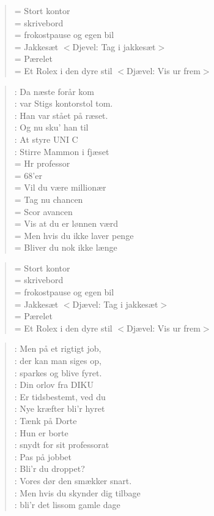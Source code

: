 \documentclass[a4paper,11pt]{article}
\begin{document}
\begin{sketch}
{\begin{verse}
= Stort kontor\\
= skrivebord\\
= frokostpause og egen bil\\
= Jakkesæt $<$Djevel: Tag i jakkesæt$>$\\
= Pærelet\\
= Et Rolex i den dyre stil $<$Djævel: Vis ur frem$>$\\
\end{verse}

\begin{verse}
: Da næste forår kom\\
: var Stigs kontorstol tom.\\
: Han var stået på ræset.\\
: Og nu sku' han til\\
: At styre UNI C\\
: Stirre Mammon i fjæset\\
= Hr professor\\
= 68'er\\
= Vil du være millionær\\
= Tag nu chancen\\
= Scor avancen\\
= Vis at du er lønnen værd\\
= Men hvis du ikke laver penge\\
= Bliver du nok ikke længe\\
\end{verse}

\begin{verse}
= Stort kontor\\
= skrivebord\\
= frokostpause og egen bil\\
= Jakkesæt $<$Djævel: Tag i jakkesæt$>$\\
= Pærelet\\
= Et Rolex i den dyre stil $<$Djævel: Vis ur frem$>$\\
\end{verse}

\begin{verse}
: Men på et rigtigt job,\\
: der kan man siges op,\\
: sparkes og blive fyret.\\
: Din orlov fra DIKU\\
: Er tidsbestemt, ved du\\
: Nye kræfter bli'r hyret\\
: Tænk på Dorte\\
: Hun er borte\\
: snydt for sit professorat\\
: Pas på jobbet\\
: Bli'r du droppet?\\
: Vores dør den smækker snart.\\
: Men hvis du skynder dig tilbage\\
: bli'r det lissom gamle dage\\
\end{verse}

}
\end{sketch}
\end{document}
